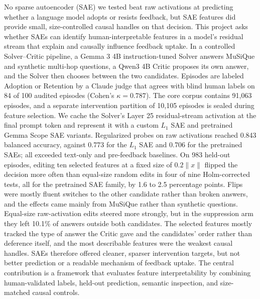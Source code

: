 No sparse autoencoder (SAE) we tested beat raw activations at predicting
whether a language model adopts or resists feedback, but SAE features did
provide small, size-controlled causal handles on that decision. This project
asks whether SAEs can identify human-interpretable features in a model's
residual stream that explain and causally influence feedback uptake. In a
controlled Solver--Critic pipeline, a Gemma 3 4B instruction-tuned Solver
answers MuSiQue and synthetic multi-hop questions, a Qwen3 4B Critic proposes
its own answer, and the Solver then chooses between the two candidates.
Episodes are labeled Adoption or Retention by a Claude judge that agrees with
blind human labels on 84 of 100 audited episodes (Cohen's $\kappa=0.787$).
The core corpus contains 91,063 episodes, and a separate intervention
partition of 10,105 episodes is sealed during feature selection. We cache the
Solver's Layer 25 residual-stream activation at the final prompt token and
represent it with a custom $L_1$ SAE and pretrained Gemma Scope SAE variants.
Regularized probes on raw activations reached 0.843 balanced accuracy, against
0.773 for the $L_1$ SAE and 0.706 for the pretrained SAEs; all exceeded
text-only and pre-feedback baselines. On 983 held-out episodes, editing ten
selected features at a fixed size of $0.2\lVert x\rVert$ flipped the decision
more often than equal-size random edits in four of nine Holm-corrected tests,
all for the pretrained SAE family, by 1.6 to 2.5 percentage points. Flips were
mostly fluent switches to the other candidate rather than broken answers, and
the effects came mainly from MuSiQue rather than synthetic questions.
Equal-size raw-activation edits steered more strongly, but in the suppression
arm they left 10.1\% of answers outside both candidates. The selected features mostly tracked the
type of answer the Critic gave and the candidates' order rather than deference
itself, and the most describable features were the weakest causal handles.
SAEs therefore offered cleaner, sparser intervention targets, but not better
prediction or a readable mechanism of feedback uptake. The central
contribution is a framework that evaluates feature interpretability by
combining human-validated labels, held-out prediction, semantic inspection,
and size-matched causal controls.
